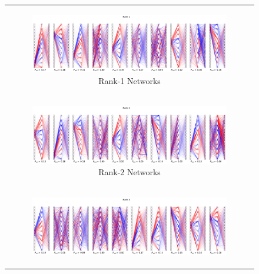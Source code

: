 \documentclass{article}
\theoremstyle{plain}
\theoremstyle{definition}
\theoremstyle{remark}
\begin{document}
\begin{figure}[ht]
    \centering
    \caption{Decomposing the toy model of high rank circuits into different numbers of subnetworks}\label{fig:s6_high_rank_decompositions}
    \begin{minipage}{\textwidth} %
        \centering
        \begin{tabular}{c}  %
            \begin{subfigure}{0.3\textwidth}
                \centering
                \includegraphics[width=\linewidth]{../figures/s6_high_rank_decompositions_rank1.pdf}
                \caption{Rank-1 Networks}
            \end{subfigure} \\
            \begin{subfigure}{0.3\textwidth}
                \centering
                \includegraphics[width=\linewidth]{../figures/s6_high_rank_decompositions_rank2.pdf}
                \caption{Rank-2 Networks}
            \end{subfigure} \\
            \begin{subfigure}{0.3\textwidth}
                \centering
                \includegraphics[width=\linewidth]{../figures/s6_high_rank_decompositions_rank3.pdf}

\end{subfigure}
\end{tabular}
\end{minipage}
\end{figure}
\end{document}

